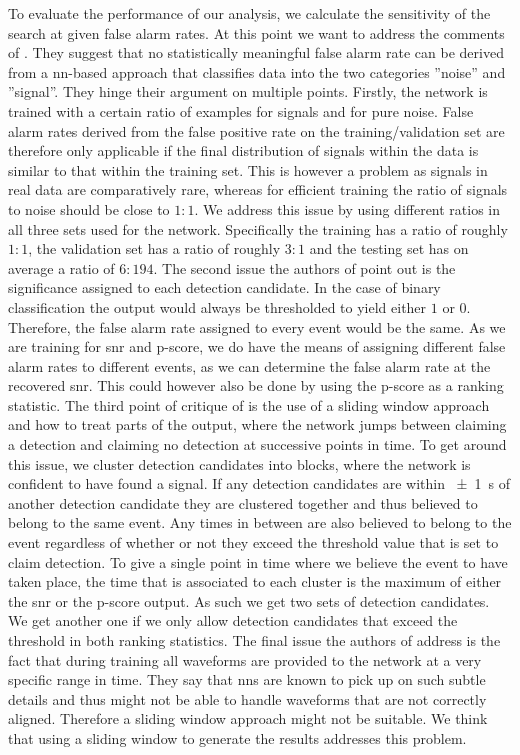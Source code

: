 To evaluate the performance of our analysis, we calculate the sensitivity of the search at given false alarm rates. At this point we want to address the comments of \cite{cnn_magiacal_bullet}. They suggest that no statistically meaningful false alarm rate can be derived from a \gls{nn}-based approach that classifies data into the two categories ''noise'' and ''signal''. They hinge their argument on multiple points. Firstly, the network is trained with a certain ratio of examples for signals and for pure noise. False alarm rates derived from the false positive rate on the training/validation set are therefore only applicable if the final distribution of signals within the data is similar to that within the training set. This is however a problem as signals in real data are comparatively rare, whereas for efficient training the ratio of signals to noise should be close to $1:1$. We address this issue by using different ratios in all three sets used for the network. Specifically the training has a ratio of roughly $1:1$, the validation set has a ratio of roughly $3:1$ and the testing set has on average a ratio of $6:194$. The second issue the authors of \cite{cnn_magiacal_bullet} point out is the significance assigned to each detection candidate. In the case of binary classification the output would always be thresholded to yield either $1$ or $0$. Therefore, the false alarm rate assigned to every event would be the same. As we are training for \gls{snr} and p-score, we do have the means of assigning different false alarm rates to different events, as we can determine the false alarm rate at the recovered \gls{snr}. This could however also be done by using the p-score as a ranking statistic. The third point of critique of \cite{cnn_magiacal_bullet} is the use of a sliding window approach and how to treat parts of the output, where the network jumps between claiming a detection and claiming no detection at successive points in time. To get around this issue, we cluster detection candidates into blocks, where the network is confident to have found a signal. If any detection candidates are within \SI{\pm 1}{\s} of another detection candidate they are clustered together and thus believed to belong to the same event. Any times in between are also believed to belong to the event regardless of whether or not they exceed the threshold value that is set to claim detection. To give a single point in time where we believe the event to have taken place, the time that is associated to each cluster is the maximum of either the \gls{snr} or the p-score output. As such we get two sets of detection candidates. We get another one if we only allow detection candidates that exceed the threshold in both ranking statistics. The final issue the authors of \cite{cnn_magiacal_bullet} address is the fact that during training all waveforms are provided to the network at a very specific range in time. They say that \gls{nn}s are known to pick up on such subtle details and thus might not be able to handle waveforms that are not correctly aligned. Therefore a sliding window approach might not be suitable. We think that using a sliding window to generate the results addresses this problem.\smallskip\\
